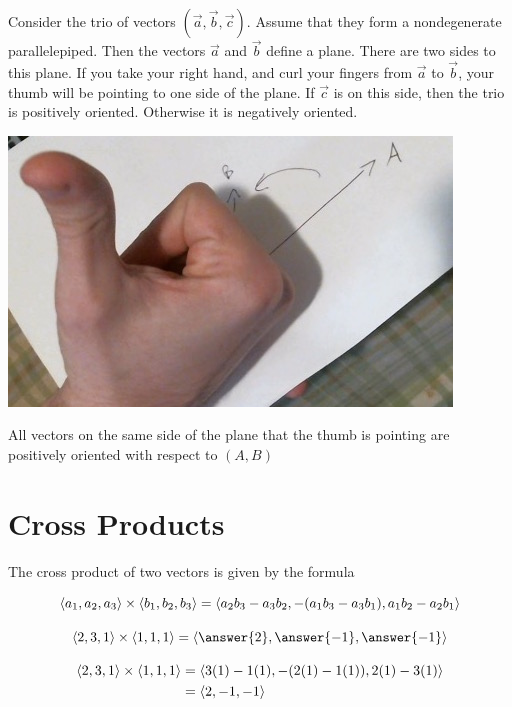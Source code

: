 \documentclass{ximera}
\begin{document}
	\begin{theorem}
	Consider the trio of vectors $(\vec{a},\vec{b},\vec{c})$.  Assume that they form a nondegenerate parallelepiped.  Then the vectors $\vec{a}$ and $\vec{b}$ define a plane.  There are two sides to this plane.  If you take your right hand, and curl your fingers from $\vec{a}$ to $\vec{b}$, your thumb will be pointing to one side of the plane.  If $\vec{c}$ is on this side, then the trio is positively oriented.  Otherwise it is negatively oriented.
		\begin{center}
		\includegraphics[width=3 in]{RHR.jpg}
		
		 All vectors on the same side of the plane that the thumb is pointing are positively oriented with respect to $(A,B)$
		\end{center}
	\end{theorem}
	

\section{Cross Products}

\begin{definition}
	The cross product of two vectors is given by the formula
	
	\[
		\left\langle a_1,a_2,a_3\right\rangle \times \left\langle b_1,b_2,b_3\right\rangle = \left\langle a_2b_3-a_3b_2, -(a_1b_3-a_3b_1), a_1b_2-a_2b_1\right\rangle
	\]
\end{definition}		

\begin{question}
	\[
	\vector{2,3,1} \times \vector{1,1,1} = \vector{\answer{2},\answer{-1},\answer{-1}}
	\]
	
	\begin{hint}
		\begin{align*}
			\left\langle 2,3,1\right\rangle \times \left\langle 1,1,1\right\rangle &= \left\langle 3(1)-1(1),-(2(1)-1(1)), 2(1)-3(1)\right\rangle\\
				&=\left\langle 2,-1,-1\right\rangle
		\end{align*}
	\end{hint}
\end{question}
\end{document}
